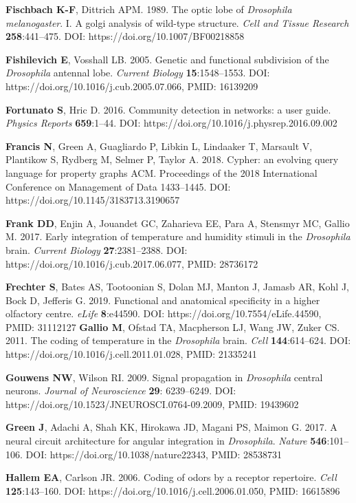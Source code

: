 \documentclass{article}
\begin{document}
\begin{hangpars}
\textbf{Fischbach K-F}, Dittrich APM. 1989. The optic lobe of \emph{Drosophila melanogaster}. I. A golgi analysis of wild-type structure. \emph{Cell and Tissue Research} \textbf{258}:441–475. DOI: https://doi.org/10.1007/BF00218858

\textbf{Fishilevich E}, Vosshall LB. 2005. Genetic and functional subdivision of the \emph{Drosophila} antennal lobe. \emph{Current} \emph{Biology} \textbf{15}:1548–1553. DOI: https://doi.org/10.1016/j.cub.2005.07.066, PMID: 16139209

\textbf{Fortunato S}, Hric D. 2016. Community detection in networks: a user guide. \emph{Physics Reports} \textbf{659}:1–44. DOI: https://doi.org/10.1016/j.physrep.2016.09.002

\textbf{Francis N}, Green A, Guagliardo P, Libkin L, Lindaaker T, Marsault V, Plantikow S, Rydberg M, Selmer P, Taylor A. 2018. Cypher: an evolving query language for property graphs ACM. Proceedings of the 2018 International Conference on Management of Data 1433–1445. DOI: https://doi.org/10.1145/3183713.3190657

\textbf{Frank DD}, Enjin A, Jouandet GC, Zaharieva EE, Para A, Stensmyr MC, Gallio M. 2017. Early integration of temperature and humidity stimuli in the \emph{Drosophila} brain. \emph{Current Biology} \textbf{27}:2381–2388. DOI: https://doi.org/10.1016/j.cub.2017.06.077, PMID: 28736172

\textbf{Frechter S}, Bates AS, Tootoonian S, Dolan MJ, Manton J, Jamasb AR, Kohl J, Bock D, Jefferis G. 2019. Functional and anatomical specificity in a higher olfactory centre. \emph{eLife} \textbf{8}:e44590. DOI: https://doi.org/10.7554/eLife.44590, PMID: 31112127 \textbf{Gallio M}, Ofstad TA, Macpherson LJ, Wang JW, Zuker CS. 2011. The coding of temperature in the \emph{Drosophila} brain. \emph{Cell} \textbf{144}:614–624. DOI: https://doi.org/10.1016/j.cell.2011.01.028, PMID: 21335241

\textbf{Gouwens NW}, Wilson RI. 2009. Signal propagation in \emph{Drosophila} central neurons. \emph{Journal of Neuroscience} \textbf{29}: 6239–6249. DOI: https://doi.org/10.1523/JNEUROSCI.0764-09.2009, PMID: 19439602

\textbf{Green J}, Adachi A, Shah KK, Hirokawa JD, Magani PS, Maimon G. 2017. A neural circuit architecture for angular integration in \emph{Drosophila}. \emph{Nature} \textbf{546}:101–106. DOI: https://doi.org/10.1038/nature22343, PMID: 28538731

\textbf{Hallem EA}, Carlson JR. 2006. Coding of odors by a receptor repertoire. \emph{Cell} \textbf{125}:143–160. DOI: https://doi.org/10.1016/j.cell.2006.01.050, PMID: 16615896


\end{hangpars}
\end{document}
